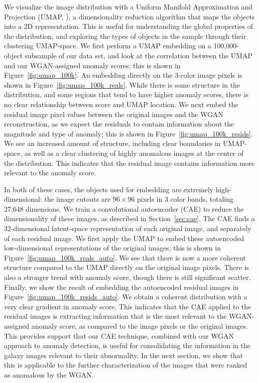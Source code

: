 \documentclass[fleqn,usenatbib,useAMS]{mnras}
\begin{document}
We visualize the image distribution with a Uniform Manifold Approximation and Projection (UMAP, \citealt{McInnes2018}), a dimensionality reduction algorithm that maps the objects into a 2D representation.
This is useful for understanding the global properties of the distribution, and exploring the types of objects in the sample through their clustering UMAP-space.
We first perform a UMAP embedding on a 100,000-object subsample of our data set, and look at the correlation between the UMAP and our WGAN-assigned anomaly scores; this is shown in Figure~\ref{fig:umap_100k}.
An embedding directly on the 3-color image pixels is shown in Figure~\ref{fig:umap_100k_reals}.
While there is some structure in the distribution, and some regions that tend to have higher anomaly scores, there is no clear relationship between score and UMAP location.
We next embed the residual image pixel values between the original images and the WGAN reconstruction, as we expect the residuals to contain information about the magnitude and type of anomaly; this is shown in Figure~\ref{fig:umap_100k_resids}.
We see an increased amount of structure, including clear boundaries in UMAP-space, as well as a clear clustering of highly anomalous images at the center of the distribution.
This indicates that the residual image contains information more relevant to the anomaly score.

In both of these cases, the objects used for embedding are extremely high-dimensional: the image cutouts are $96 \times 96$ pixels in 3 color bands, totaling 27,648 dimensions. 
We train a convolutional autoencoder (CAE) to reduce the dimensionality of these images, as described in Section~\ref{sec:cae}.
The CAE finds a 32-dimensional latent-space representation of each original image, and separately of each residual image.
We first apply the UMAP to embed these autoencoded low-dimensional representations of the original images; this is shown in Figure~\ref{fig:umap_100k_reals_auto}.
We see that there is now a more coherent structure compared to the UMAP directly on the original image pixels.
There is also a stronger trend with anomaly score, though there is still significant scatter.
Finally, we show the result of embedding the autoencoded residual images in Figure~\ref{fig:umap_100k_resids_auto}. 
We obtain a coherent distribution with a very clear gradient in anomaly score.
This indicates that the CAE applied to the residual images is extracting information that is the most relevant to the WGAN-assigned anomaly score, as compared to the image pixels or the original images.
This provides support that our CAE technique, combined with our WGAN approach to anomaly detection, is useful for consolidating the information in the galaxy images relevant to their abnormality.
In the next section, we show that this is applicable to the further characterization of the images that were ranked as anomalous by the WGAN.
\end{document}
